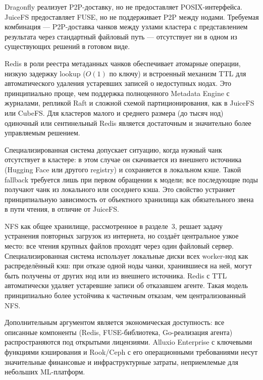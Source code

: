  Dragonfly реализует P2P-доставку, но не предоставляет POSIX-интерфейса. JuiceFS предоставляет FUSE, но не поддерживает P2P между нодами. Требуемая комбинация --- P2P-доставка чанков между узлами кластера с представлением результата через стандартный файловый путь --- отсутствует ни в одном из существующих решений в готовом виде.

 Redis в роли реестра метаданных чанков обеспечивает атомарные операции, низкую задержку lookup ($O(1)$ по ключу) и встроенный механизм TTL для автоматического удаления устаревших записей о недоступных нодах. Это принципиально проще, чем поддержка полноценного Metadata Engine с журналами, репликой Raft и сложной схемой партиционирования, как в JuiceFS или CubeFS. Для кластеров малого и среднего размера (до тысяч нод) одиночный или сентинельный Redis является достаточным и значительно более управляемым решением.

 Специализированная система допускает ситуацию, когда нужный чанк отсутствует в кластере: в этом случае он скачивается из внешнего источника (Hugging Face или другого registry) и сохраняется в локальном кэше. Такой fallback требуется лишь при первом обращении к модели; все последующие поды получают чанк из локального или соседнего кэша. Это свойство устраняет принципиальную зависимость от объектного хранилища как обязательного звена в пути чтения, в отличие от JuiceFS.

 NFS как общее хранилище, рассмотренное в разделе~3, решает задачу устранения повторных загрузок из интернета, но создаёт центральное узкое место: все чтения крупных файлов проходят через один файловый сервер. Специализированная система использует локальные диски всех worker-нод как распределённый кэш: при отказе одной ноды чанки, хранившиеся на ней, могут быть получены от других нод или из внешнего источника. Redis с TTL автоматически удаляет устаревшие записи об отказавшем агенте. Такая модель принципиально более устойчива к частичным отказам, чем централизованный NFS.

Дополнительным аргументом является экономическая доступность: все описанные компоненты (Redis, FUSE-библиотека, Go-реализация агента) распространяются под открытыми лицензиями. Alluxio Enterprise с ключевыми функциями кэширования и Rook/Ceph с его операционными требованиями несут значительные финансовые и инфраструктурные затраты, неприемлемые для небольших ML-платформ.

